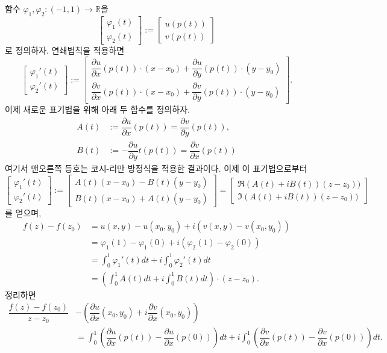 함수 $\varphi_1, \varphi_2 : (-1,1) \to \mathbb R$을
\[
\begin{bmatrix}
\varphi_1(t) \\
\varphi_2(t)
\end{bmatrix}
:= 
\begin{bmatrix}
u(p(t)) \\
v(p(t))
\end{bmatrix}
\]
로 정의하자.
연쇄법칙을 적용하면
\[
\begin{bmatrix}
\varphi_1'(t) \\
\varphi_2'(t)
\end{bmatrix}
:= 
\begin{bmatrix}
\dfrac{\partial u}{\partial x}(p(t))\cdot (x-x_0) + \dfrac{\partial u}{\partial y}(p(t))\cdot (y-y_0) \\
\dfrac{\partial v}{\partial x}(p(t))\cdot (x-x_0) + \dfrac{\partial v}{\partial y}(p(t))\cdot (y-y_0) 
\end{bmatrix}.
\]
이제 새로운 표기법을 위해 아래 두 함수를 정의하자.  %
\begin{align*}
A(t) &:= \dfrac{\partial u}{\partial x}(p(t)) = \dfrac{\partial v}{\partial y}(p(t)), \\
B(t) &:= - \dfrac{\partial u}{\partial y}t(p(t)) = \dfrac{\partial v}{\partial x}(p(t))
\end{align*}
여기서 맨오른쪽 등호는 코시-리만 방정식을 적용한 결과이다.
이제 이 표기법으로부터
\[
\begin{bmatrix}
\varphi_1'(t) \\
\varphi_2'(t)
\end{bmatrix}
:= 
\begin{bmatrix}
A(t) (x-x_0) - B(t) (y-y_0) \\
B(t) (x-x_0) + A(t) (y-y_0) 
\end{bmatrix}
= 
\begin{bmatrix}
\Re(A(t)+iB(t)) (z-z_0)) \\
\Im(A(t)+iB(t)) (z-z_0)) 
\end{bmatrix}
\]
를 얻으며,
\begin{align*}
f(z) - f(z_0) 
&= u(x,y) - u(x_0, y_0) + i (v(x,y) - v(x_0, y_0)) \\
&= \varphi_1(1) - \varphi_1(0) + i(\varphi_2(1) - \varphi_2(0)) \\
&= \int_0^1 \varphi_1'(t)dt + i\int_0^1 \varphi_2'(t)dt \\
&= \left( \int_0^1 A(t)dt + i \int_0^1 B(t)dt \right) \cdot (z-z_0).
\end{align*}
정리하면
\begin{align*}
\dfrac{f(z)-f(z_0)}{z-z_0} 
&- \left( \dfrac{\partial u}{\partial x}(x_0,y_0) 
+ i \dfrac{\partial v}{\partial x}(x_0,y_0) \right) \\
&= \int_0^1 \left( \dfrac{\partial u}{\partial x}(p(t)) 
- \dfrac{\partial u}{\partial x}(p(0)) \right)dt 
+ i \int_0^1 \left( \dfrac{\partial v}{\partial x}(p(t)) 
- \dfrac{\partial v}{\partial x}(p(0)) \right)dt.
\end{align*}
